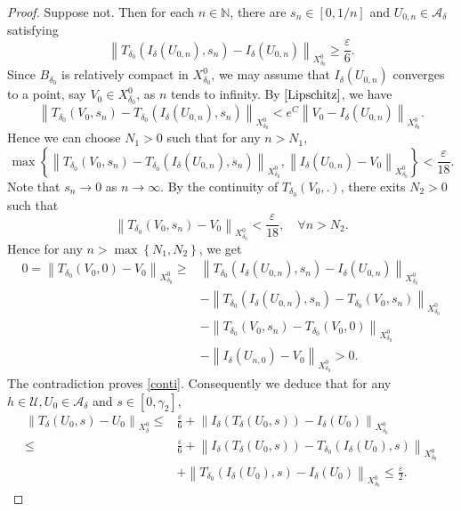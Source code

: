 \documentclass[11pt]{amsart}
\begin{document}
\begin{proof}
Suppose not. Then for each $n \in \mathbb{N}$, there are $s_{n} \in[0,1 / n]$ and $U_{0,n} \in \mathcal{A}_{{\delta}}$ satisfying
$$
\left\|T_{{\delta}_{0}}\left(I_{{\delta}}\left(U_{0,n}\right), s_{n}\right)-I_{{\delta}}\left(U_{0,n}\right)\right\|_{X^0_{{\delta}_{0}}}\geq \frac{\varepsilon}{6} .
$$
Since $B_{{\delta}_{0}}$ is relatively compact in $X^0_{{\delta}_{0}}$, we may assume that $I_{{\delta}}\left(U_{0,n}\right)$ converges to a point, say $V_{0} \in X^0_{{\delta}_{0}}$, as $n$ tends to infinity. By $\eqref{Lipschitz}$, we have
$$
\left\|T_{{\delta}_{0}}\left(V_{0}, s_{n}\right)-T_{{\delta}_{0}}\left(I_{{\delta}}\left(U_{0,n}\right), s_{n}\right)\right\|_{X^0_{{\delta}_{0}}} <e^{C}\left\|V_{0}-I_{{\delta}}\left(U_{0,n}\right)\right\|_{X^0_{{\delta}_{0}}}.
$$
Hence we can choose $N_{1}>0$ such that for any $n>N_{1}$,
$$
\max \left\{\left\|T_{{\delta}_{0}}\left(V_{0}, s_{n}\right)-T_{{\delta}_{0}}\left(I_{{\delta}}\left(U_{0,n}\right), s_{n}\right)\right\|_{X^0_{{\delta}_{0}}},\left\|I_{{\delta}}\left(U_{0,n}\right)-V_{0}\right\|_{X^0_{{\delta}_{0}}}\right\}<\frac{\varepsilon}{18}.
$$
Note that $s_{n} \rightarrow 0$ as $n \rightarrow \infty$. By the continuity of $T_{{\delta}_{0}}\left(V_{0},.\right)$, there exits $N_{2}>0$ such that
$$
\left\|T_{{\delta}_{0}}\left(V_{0}, s_{n}\right)-V_{0}\right\|_{X^0_{{\delta}_{0}}}<\frac{\varepsilon}{18}, \quad \forall n>N_{2}.
$$
Hence for any $n>\max \left\{N_{1}, N_{2}\right\}$, we get
\begin{align*}
0=\left\|T_{{\delta}_{0}}\left(V_{0}, 0\right)-V_{0}\right\|_{X^0_{{\delta}_{0}}} \geq & \left\|T_{{\delta}_{0}}\left(I_{{\delta}}\left(U_{0,n}\right), s_{n}\right)-I_{{\delta}}\left(U_{0,n}\right)\right\|_{X^0_{{\delta}_{0}}}\\
& -\left\|T_{{\delta}_{0}}\left(I_{{\delta}}\left(U_{0,n}\right), s_{n}\right)-T_{{\delta}_{0}}\left(V_{0}, s_{n}\right)\right\|_{X^0_{{\delta}_{0}}}\\
& -\left\|T_{{\delta}_{0}}\left(V_{0}, s_{n}\right)-T_{{\delta}_{0}}\left(V_{0}, 0\right)\right\|_{X^0_{{\delta}_{0}}} \\
& -\left\|I_{{\delta}}\left(U_{n, 0}\right)-V_{0}\right\|_{X^0_{{\delta}_{0}}}>0 .
\end{align*}
The contradiction proves \eqref{conti}.
Consequently we deduce that for any $h \in \mathcal{U}, U_{0} \in \mathcal{A}_{\delta}$ and $s \in\left[0, \gamma_{2}\right]$,
\begin{align*}
\left\|T_{{\delta}}\left(U_{0}, s\right)-U_{0}\right\|_{X^0_{{\delta}}} \leq & \frac{\varepsilon}{6}+\left\|I_{{\delta}}\left(T_{{\delta}}\left(U_{0}, s\right)\right)-I_{{\delta}}\left(U_{0}\right)\right\|_{X^0_{{\delta}_{0}}} \\
\leq & \frac{\varepsilon}{6}+\left\|I_{{\delta}}\left(T_{{\delta}}\left(U_{0}, s\right)\right)-T_{{\delta}_{0}}\left(I_{{\delta}}\left(U_{0}\right), s\right)\right\|_{X^0_{{\delta}_{0}}} \\
& +\left\|T_{{\delta}_{0}}\left(I_{\delta}\left(U_{0}\right), s\right)-I_{{\delta}}\left(U_{0}\right)\right\|_{X^0_{{\delta}_{0}}} \leq \frac{\varepsilon}{2}.
\end{align*}


\end{proof}
\end{document}
